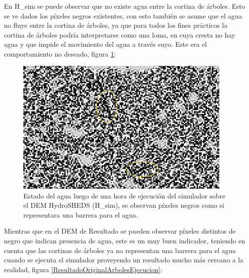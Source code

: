 \documentclass[10pt,a4paper, twoside]{report}
\begin{document}
En H\_sim se puede observar que no existe agua entre la cortina de árboles. Esto se ve dados los píxeles negros existentes, con esto también se asume que el agua no fluye entre la cortina de árboles, ya que para todos los fines prácticos la cortina de árboles podría interpretarse como una loma, en cuya cresta no hay agua y que impide el movimiento del agua a través suyo. Este era el comportamiento no deseado, figura \ref{HydoSHEDSOriginalArbolesEjecucion}:


\begin{figure}[H]
   \centering      
   \includegraphics[width=0.95\textwidth]{imagenes/HydoSHEDSOriginalArbolesEjecucion.jpg}
 \caption{Estado del agua luego de una hora de ejecución del simulador sobre el DEM HydroSHEDS (H\_sim), se observan píxeles negros como si representara una barrera para el agua.}
 \label{HydoSHEDSOriginalArbolesEjecucion}
\end{figure}

Mientras que en el DEM de Resultado se pueden observar píxeles distintos de negro que indican presencia de agua, este es un muy buen indicador, teniendo en cuenta que las cortinas de árboles ya no representan una barrera para el agua cuando se ejecuta el simulador proveyendo un resultado mucho más cercano a la realidad, figura \ref{ResultadoOriginalArbolesEjecucion}:
\end{document}
